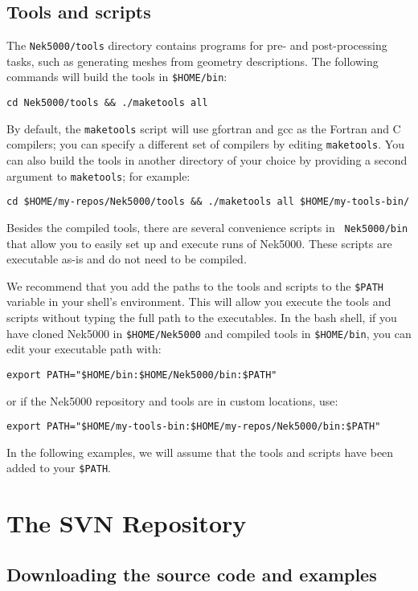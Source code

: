\subsection{Tools and scripts}

The {\tt Nek5000/tools} directory contains programs for pre- and
post-processing tasks, such as generating meshes from geometry descriptions.  The following commands will build the tools in {\tt \$HOME/bin}:
\begin{verbatim}
cd Nek5000/tools && ./maketools all
\end{verbatim}
By default, the {\tt maketools} script will use gfortran and gcc as the
Fortran and C compilers; you can specify a different set of compilers by
editing {\tt maketools}.  You can also build the tools in another
directory of your choice by providing a second argument to {\tt maketools}; for example:
\begin{verbatim}
cd $HOME/my-repos/Nek5000/tools && ./maketools all $HOME/my-tools-bin/
\end{verbatim}

Besides the compiled tools, there are several convenience scripts in {\tt
Nek5000/bin} that allow you to easily set up and execute runs of Nek5000.
These scripts are executable as-is and do not need to be compiled. 

We recommend that you add the paths to the tools and scripts to the {\tt \$PATH}
variable in your shell's environment.  This will allow you execute the tools
and scripts without typing the full path to the executables.  In the bash
shell, if you have cloned Nek5000 in {\tt \$HOME/Nek5000} and compiled tools in
{\tt \$HOME/bin}, you can edit your executable path with:
\begin{verbatim}
export PATH="$HOME/bin:$HOME/Nek5000/bin:$PATH"
\end{verbatim}
or if the Nek5000 repository and tools are in custom locations, use:
\begin{verbatim}
export PATH="$HOME/my-tools-bin:$HOME/my-repos/Nek5000/bin:$PATH"
\end{verbatim}
In the following examples, we will assume that the tools and scripts have been
added to your {\tt \$PATH}.

\section{The SVN Repository}

\subsection{Downloading the source code and examples}

